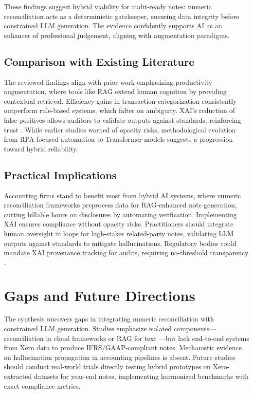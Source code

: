 These findings suggest hybrid viability for audit-ready notes: numeric reconciliation acts as a deterministic gatekeeper, ensuring data integrity before constrained LLM generation. The evidence confidently supports AI as an enhancer of professional judgement, aligning with augmentation paradigms.

\subsection{Comparison with Existing Literature}
The reviewed findings align with prior work emphasizing productivity augmentation, where tools like RAG extend human cognition by providing contextual retrieval. Efficiency gains in transaction categorization consistently outperform rule-based systems, which falter on ambiguity. XAI's reduction of false positives allows auditors to validate outputs against standards, reinforcing trust \cite{Zhong2024}. While earlier studies warned of opacity risks, methodological evolution from RPA-focused automation to Transformer models suggests a progression toward hybrid reliability.

\subsection{Practical Implications}
Accounting firms stand to benefit most from hybrid AI systems, where numeric reconciliation frameworks preprocess data for RAG-enhanced note generation, cutting billable hours on disclosures by automating verification. Implementing XAI ensures compliance without opacity risks. Practitioners should integrate human oversight in loops for high-stakes related-party notes, validating LLM outputs against standards to mitigate hallucinations. Regulatory bodies could mandate XAI provenance tracking for audits, requiring no-threshold transparency \cite{Maknickiene2025}.

\section{Gaps and Future Directions}
The synthesis uncovers gaps in integrating numeric reconciliation with constrained LLM generation. Studies emphasize isolated components—reconciliation in cloud frameworks \cite{Badugu2025} or RAG for text \cite{Vemulapalli2025}—but lack end-to-end systems from Xero data to produce IFRS/GAAP-compliant notes. Mechanistic evidence on hallucination propagation in accounting pipelines is absent. Future studies should conduct real-world trials directly testing hybrid prototypes on Xero-extracted datasets for year-end notes, implementing harmonized benchmarks with exact compliance metrics.

